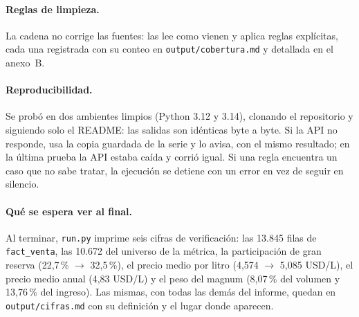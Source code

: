 \paragraph{Reglas de limpieza.} La cadena no corrige las fuentes: las lee como vienen y aplica reglas explícitas, cada una registrada con su conteo en \texttt{output/cobertura.md} y detallada en el anexo~B.

\paragraph{Reproducibilidad.} Se probó en dos ambientes limpios (Python 3.12 y 3.14), clonando el repositorio y siguiendo solo el README: las salidas son idénticas byte a byte. Si la API no responde, usa la copia guardada de la serie y lo avisa, con el mismo resultado; en la última prueba la API estaba caída y corrió igual. Si una regla encuentra un caso que no sabe tratar, la ejecución se detiene con un error en vez de seguir en silencio.

\paragraph{Qué se espera ver al final.} Al terminar, \texttt{run.py} imprime seis cifras de verificación: las 13.845 filas de \texttt{fact\_venta}, las 10.672 del universo de la métrica, la participación de gran reserva (22,7\,\% $\rightarrow$ 32,5\,\%), el precio medio por litro (4,574 $\rightarrow$ 5,085 USD/L), el precio medio anual (4,83 USD/L) y el peso del magnum (8,07\,\% del volumen y 13,76\,\% del ingreso). Las mismas, con todas las demás del informe, quedan en \texttt{output/cifras.md} con su definición y el lugar donde aparecen.

